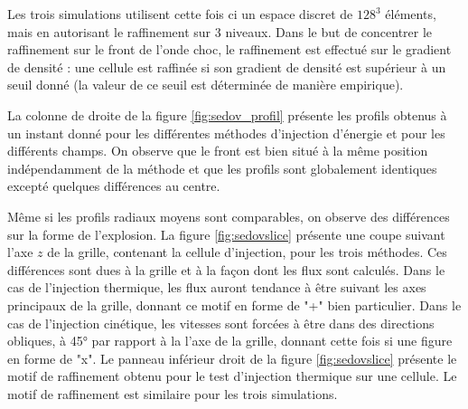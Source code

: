 Les trois simulations utilisent cette fois ci un espace discret de $128^3$ éléments, mais en autorisant le raffinement sur 3 niveaux.
Dans le but de concentrer le raffinement sur le front de l'onde choc, le raffinement est effectué sur le gradient de densité : une cellule est raffinée si son gradient de densité est supérieur à un seuil donné (la valeur de ce seuil est déterminée de manière empirique).

La colonne de droite de la figure \ref{fig:sedov_profil} présente les profils obtenus à un instant donné pour les différentes méthodes d'injection d'énergie et pour les différents champs.
On observe que le front est bien situé à la même position indépendamment de la méthode et que les profils sont globalement identiques excepté quelques différences au centre.

Même si les profils radiaux moyens sont comparables, on observe des différences sur la forme de l'explosion.
La figure \ref{fig:sedovslice} présente une coupe suivant l'axe $z$ de la grille, contenant la cellule d'injection, pour les trois méthodes.
Ces différences sont dues à la grille et à la façon dont les flux sont calculés.
Dans le cas de l'injection thermique, les flux auront tendance à être suivant les axes principaux de la grille, donnant ce motif en forme de "+" bien particulier.
Dans le cas de l'injection cinétique, les vitesses sont forcées à être dans des directions obliques, à 45° par rapport à la l'axe de la grille, donnant cette fois si une figure en forme de "x".
Le panneau inférieur droit de la figure \ref{fig:sedovslice} présente le motif de raffinement obtenu pour le test d'injection thermique sur une cellule.
Le motif de raffinement est similaire pour les trois simulations.

